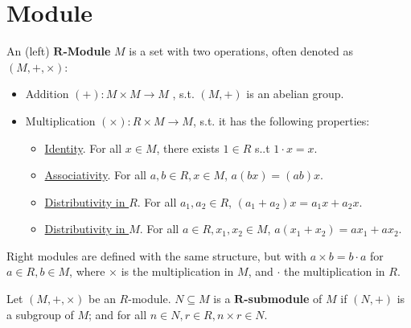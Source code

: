 \documentclass{article}
\begin{document}

\tableofcontents
\newpage

\section{Module}

\begin{definition}[$R$-Module]
    An (left) \textbf{$\bm{R}$-Module} $M$ is a set with two operations, often denoted as $(M, +, \times)$:
    \begin{itemize}
        \item Addition $(+): M\times M \to M$ , s.t. $(M, +)$ is an abelian group.
        \item Multiplication $(\times): R\times M \to M$, s.t. it has the following properties:
            \begin{itemize}
                \item \underline{Identity}. For all $x\in M$, there exists $1\in R$ s..t $1\cdot x = x$.
                \item \underline{Associativity}. For all $a, b\in R, x\in M$, $a(bx) = (ab)x$.
                \item \underline{Distributivity in $R$}. For all $a_1, a_2\in R$, $(a_1 + a_2)x = a_1 x + a_2 x$.
                \item \underline{Distributivity in $M$}. For all $a\in R, x_1, x_2\in M$, $a(x_1 + x_2) = a x_1 + a x_2$.
            \end{itemize}
    \end{itemize}
    Right modules are defined with the same structure, but with $a\times b = b\cdot a$ for $a\in R, b\in M$, where $\times$ is the multiplication in $M$, and $\cdot$ the multiplication in $R$.
\end{definition}

\begin{definition}[Submodule]
    Let $(M, +, \times)$ be an $R$-module. $N \subseteq M$ is a \textbf{$\bm{R}$-submodule} of $M$ if $(N, +)$ is a subgroup of $M$; and for all $n\in N, r\in R, n\times r\in N$.
\end{definition}
\end{document}
